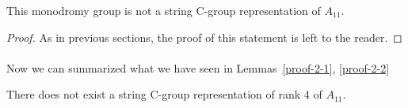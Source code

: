 \begin{lemma}
  This monodromy group is not a string C-group representation of $A_{11}$.
\end{lemma}

\begin{proof}
  As in previous sections, the proof of this statement is left to the reader.
\end{proof}

\paragraph{}
Now we can summarized what we have seen in Lemmas~\ref{proof-2-1}, \ref{proof-2-2}

\begin{theorem}
  There does not exist a string C-group representation of rank 4 of $A_{11}$.
\end{theorem}
